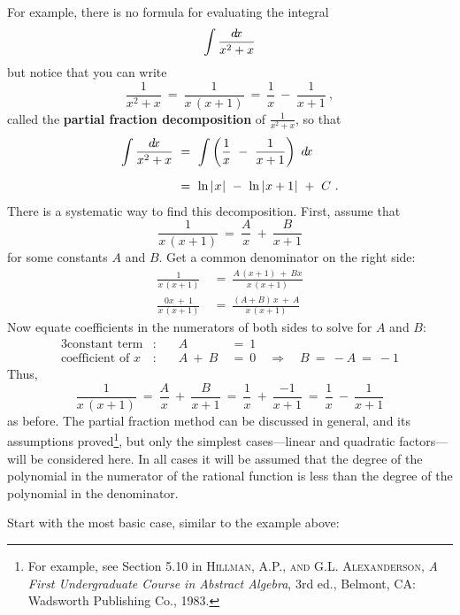 For example, there is no formula for evaluating the integral
\[
\int \frac{d\!x}{x^2 + x}
\]
but notice that you can write
\[
\frac{1}{x^2 + x} ~=~ \frac{1}{x\,(x+1)} ~=~ \frac{1}{x} ~-~ \frac{1}{x+1} ~,
\]
called the \textbf{partial fraction decomposition} of $\frac{1}{x^2 + x}$, so
that
\begin{align*}
\int \frac{d\!x}{x^2 + x} ~&=~ \int \left(\frac{1}{x} ~-~ \frac{1}{x+1}\right)~d\!x\\[6pt]
&=~ \ln\,\lvert\mspace{1mu}x\mspace{1mu}\rvert ~-~ \ln\,\lvert\mspace{1mu}x+1\mspace{1mu}\rvert ~+~ C ~.
\end{align*}
There is a systematic way to find this decomposition. First, assume that
\[
\frac{1}{x\,(x+1)} ~=~ \frac{A}{x} ~+~ \frac{B}{x+1}
\]
for some constants $A$ and $B$. Get a common denominator on the right side:
\begin{align*}
\frac{1}{x\,(x+1)} ~&=~ \frac{A\,(x+1) ~+~ Bx}{x\,(x+1)}\\[4pt]
\frac{0x ~+~ 1}{x\,(x+1)} ~&=~ \frac{(A + B)\,x ~+~ A}{x\,(x+1)}
\end{align*}
Now equate coefficients in the numerators of both sides to solve for $A$ and
$B$:
\begin{alignat*}{3}
\text{constant term}&: & A ~&=~ 1\\
\text{coefficient of $x$}&: \quad & A ~+~ B ~&=~ 0 \quad\Rightarrow\quad B ~=~ -A ~=~ -1
\end{alignat*}
Thus,
\[
\frac{1}{x\,(x+1)} ~=~ \frac{A}{x} ~+~ \frac{B}{x+1} ~=~ \frac{1}{x} ~+~ \frac{-1}{x+1}
~=~ \frac{1}{x} ~-~ \frac{1}{x+1}
\]
as before.
\newpage
The partial fraction method can be discussed in general, and its
assumptions proved\footnote{For example, see Section 5.10 in \textsc{Hillman,
A.P., and G.L. Alexanderson}, \emph{A First Undergraduate Course in Abstract
Algebra}, 3rd ed., Belmont, CA: Wadsworth Publishing Co., 1983.}, but only the
simplest cases---linear and quadratic factors--- will be considered here.
In all cases it will be assumed that the degree of the polynomial in the
numerator of the rational function is less than the degree of the polynomial in
the denominator.

Start with the most basic case, similar to the example above:



